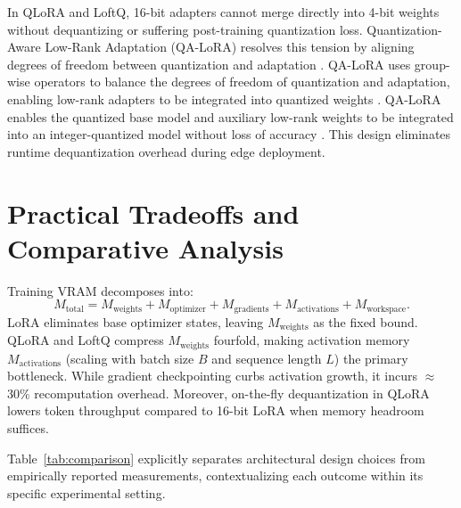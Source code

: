 \documentclass[11pt,a4paper]{article}
\begin{document}
In QLoRA and LoftQ, 16-bit adapters cannot merge directly into 4-bit weights without dequantizing or suffering post-training quantization loss. Quantization-Aware Low-Rank Adaptation (QA-LoRA) resolves this tension by aligning degrees of freedom between quantization and adaptation \cite{xu2023qa}. QA-LoRA uses group-wise operators to balance the degrees of freedom of quantization and adaptation, enabling low-rank adapters to be integrated into quantized weights \cite{xu2023qa}. QA-LoRA enables the quantized base model and auxiliary low-rank weights to be integrated into an integer-quantized model without loss of accuracy \cite{xu2023qa}. This design eliminates runtime dequantization overhead during edge deployment.

\section{Practical Tradeoffs and Comparative Analysis}

Training VRAM decomposes into:
\begin{equation}
M_{\text{total}} = M_{\text{weights}} + M_{\text{optimizer}} + M_{\text{gradients}} + M_{\text{activations}} + M_{\text{workspace}}.
\end{equation}
LoRA eliminates base optimizer states, leaving $M_{\text{weights}}$ as the fixed bound. QLoRA and LoftQ compress $M_{\text{weights}}$ fourfold, making activation memory $M_{\text{activations}}$ (scaling with batch size $B$ and sequence length $L$) the primary bottleneck. While gradient checkpointing curbs activation growth, it incurs $\approx$30\% recomputation overhead. Moreover, on-the-fly dequantization in QLoRA lowers token throughput compared to 16-bit LoRA when memory headroom suffices.

Table~\ref{tab:comparison} explicitly separates architectural design choices from empirically reported measurements, contextualizing each outcome within its specific experimental setting.
\end{document}
